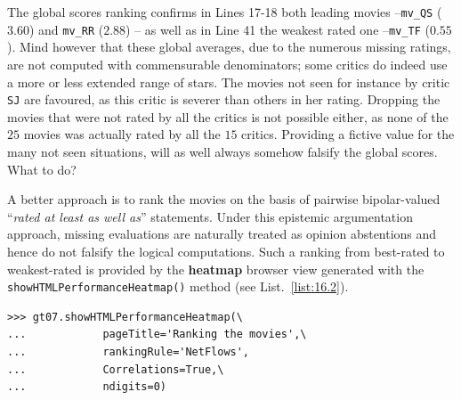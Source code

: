 The global scores ranking confirms in Lines 17-18 both leading movies --\texttt{mv\_QS} ($3.60$) and \texttt{mv\_RR} ($2.88$) -- as well as in Line 41 the weakest rated one --\texttt{mv\_TF} ($0.55$). Mind however that these global averages, due to the numerous missing ratings, are not computed with commensurable denominators; some critics do indeed use a more or less extended range of stars. The movies not seen for instance by critic \texttt{SJ} are favoured, as this critic is severer than others in her rating. Dropping the movies that were not rated by all the critics is not possible either, as none of the $25$ movies was actually rated by all the $15$ critics. Providing a fictive value for the many not seen situations, will as well always somehow falsify the global scores. What to do?

A better approach is to rank the movies on the basis of pairwise bipolar-valued  ``\emph{rated at least as well as}'' statements. Under this epistemic argumentation approach, missing evaluations are naturally treated as opinion abstentions and hence do not falsify the logical computations. Such a \NetFlows ranking from best-rated to weakest-rated is provided by the \textbf{heatmap} browser view generated with the \texttt{showHTMLPerformanceHeatmap()} method (see List.~\vref{list:16.2}).
\begin{lstlisting}[caption={Showing the movie from best to worst rated in a heatmap view},label=list:16.2]
>>> gt07.showHTMLPerformanceHeatmap(\
...            pageTitle='Ranking the movies',\  
...            rankingRule='NetFlows',
...            Correlations=True,\
...            ndigits=0)
\end{lstlisting}
